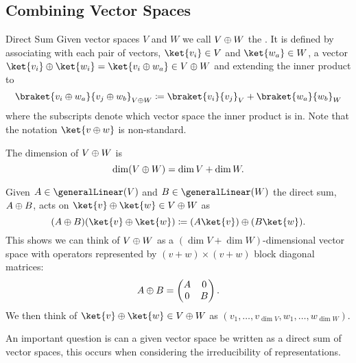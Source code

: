 \subsection{Combining Vector Spaces}
\begin{dfn}{Direct Sum}{}
    Given vector spaces \(V\) and \(W\) we call \(V\oplus W\) the .
    It is defined by associating with each pair of vectors, \(\ket{v_i} \in V\) and \(\ket{w_a} \in W\), a vector \(\ket{v_i} \directsum \ket{w_i} = \ket{v_i \directsum w_a} \in V \directsum W\) and extending the inner product to
    \begin{equation}
        \braket{v_i \directsum w_a}{v_j \directsum w_b}_{V\directsum W} \coloneqq \braket{v_i}{v_j}_{V} + \braket{w_a}{w_b}_{W}
    \end{equation}
    where the subscripts denote which vector space the inner product is in.
    Note that the notation \(\ket{v \directsum w}\) is non-standard.
    
    The dimension of \(V \oplus W\) is
    \begin{equation}
        \dim(V \oplus W) = \dim V + \dim W.
    \end{equation}
    
    Given \(A \in \generalLinear(V)\) and \(B \in \generalLinear(W)\) the direct sum, \(A \oplus B\), acts on \(\ket{v} \directsum \ket{w} \in V \directsum W\) as
    \begin{equation}
        (A \directsum B)(\ket{v} \directsum \ket{w}) \coloneqq (A\ket{v}) \directsum (B\ket{w}).
    \end{equation}
    This shows we can think of \(V \oplus W\) as a \((\dim V + \dim W)\)-dimensional vector space with operators represented by \((v + w) \times (v + w)\) block diagonal matrices:
    \begin{equation}
        A \oplus B = 
        \begin{pmatrix}
            A & 0\\
            0 & B
        \end{pmatrix}
        .
    \end{equation}
    We then think of \(\ket{v} \directsum \ket{w} \in V \directsum W\) as \((v_1, \dotsc, v_{\dim V}, w_1, \dotsc, w_{\dim W})\).
\end{dfn}

An important question is can a given vector space be written as a direct sum of vector spaces, this occurs when considering the irreducibility of representations.


